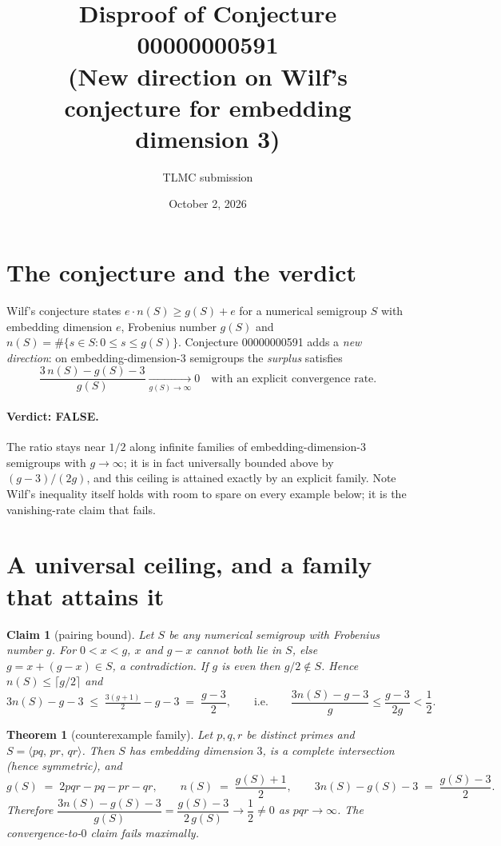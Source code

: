 \documentclass[11pt]{article}
\title{Disproof of Conjecture 00000000591\\
\large (New direction on Wilf's conjecture for embedding dimension 3)}
\author{TLMC submission}
\date{October 2, 2026}
\newtheorem{theorem}{Theorem}
\newtheorem{claim}{Claim}
\newcommand{\Sg}[1]{\langle #1\rangle}
\begin{document}
\maketitle

\section{The conjecture and the verdict}

Wilf's conjecture states $e \cdot n(S) \ge g(S) + e$ for a numerical semigroup $S$
with embedding dimension $e$, Frobenius number $g(S)$ and $n(S)=\#\{s \in S : 0 \le s \le g(S)\}$.
Conjecture 00000000591 adds a \emph{new direction}: on embedding-dimension-$3$
semigroups the \emph{surplus} satisfies
\[
\frac{3\,n(S) - g(S) - 3}{g(S)} \xrightarrow[g(S)\to\infty]{} 0
\quad\text{with an explicit convergence rate.}
\]

\paragraph{Verdict: FALSE.} The ratio stays near $1/2$ along infinite families of
embedding-dimension-$3$ semigroups with $g \to \infty$; it is in fact universally
bounded above by $(g-3)/(2g)$, and this ceiling is attained exactly by an explicit
family. Note Wilf's inequality itself holds with room to spare on every example
below; it is the vanishing-rate claim that fails.

\section{A universal ceiling, and a family that attains it}

\begin{claim}[pairing bound]
Let $S$ be any numerical semigroup with Frobenius number $g$. For $0 < x < g$,
$x$ and $g-x$ cannot both lie in $S$, else $g = x + (g-x) \in S$, a contradiction.
If $g$ is even then $g/2 \notin S$. Hence $n(S) \le \lceil g/2 \rceil$ and
\[
3n(S) - g - 3 \;\le\; \tfrac{3(g+1)}{2} - g - 3 \;=\; \frac{g-3}{2},
\qquad\text{i.e.}\qquad
\frac{3n(S)-g-3}{g} \le \frac{g-3}{2g} < \frac12 .
\]
\end{claim}

\begin{theorem}[counterexample family]
Let $p,q,r$ be distinct primes and $S = \Sg{pq,\, pr,\, qr}$. Then $S$ has
embedding dimension $3$, is a complete intersection (hence symmetric), and
\[
g(S) \;=\; 2pqr - pq - pr - qr, \qquad
n(S) \;=\; \frac{g(S)+1}{2}, \qquad
3n(S) - g(S) - 3 \;=\; \frac{g(S)-3}{2}.
\]
Therefore $\dfrac{3n(S)-g(S)-3}{g(S)} = \dfrac{g(S)-3}{2\,g(S)} \to \dfrac12 \neq 0$
as $pqr \to \infty$. The convergence-to-$0$ claim fails maximally.
\end{theorem}
\end{document}
